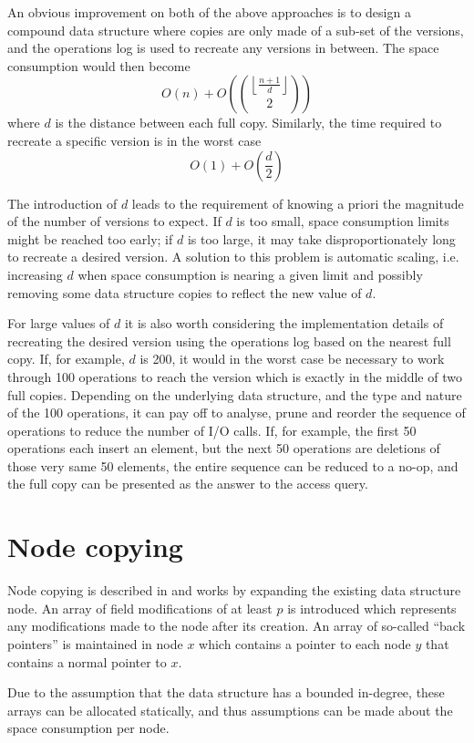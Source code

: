 An obvious improvement on both of the above approaches is to design a compound
data structure where copies are only made of a sub-set of the versions, and the
operations log is used to recreate any versions in between. The space
consumption would then become
$$O(n)+O\left(\binom{\left\lfloor{\frac{n+1}{d}}\right\rfloor}{2}\right)$$ where
$d$ is the distance between each full copy. Similarly, the time required to
recreate a specific version is in the worst case
$$O(1)+O\left(\frac{d}{2}\right)$$

The introduction of $d$ leads to the requirement of knowing a priori the
magnitude of the number of versions to expect. If $d$ is too small, space
consumption limits might be reached too early; if $d$ is too large, it may take
disproportionately long to recreate a desired version. A solution to this
problem is automatic scaling, i.e. increasing $d$ when space consumption is
nearing a given limit and possibly removing some data structure copies to
reflect the new value of $d$.

For large values of $d$ it is also worth considering the implementation details
of recreating the desired version using the operations log based on the
nearest full copy. If, for example, $d$ is 200, it would in the worst case be
necessary to work through 100 operations to reach the version which is exactly
in the middle of two full copies. Depending on the underlying data structure,
and the type and nature of the 100 operations, it can pay off to analyse,
prune and reorder the sequence of operations to reduce the number of I/O calls.
If, for example, the first 50 operations each insert an element, but the next 50
operations are deletions of those very same 50 elements, the entire sequence can
be reduced to a no-op, and the full copy can be presented as the answer to the
access query.

\section{Node copying}
Node copying is described in \cite{Driscoll198986} and works by expanding the
existing data structure node. An array of field modifications of at least $p$ is
introduced which represents any modifications made to the node after its
creation. An array of so-called ``back pointers'' is maintained in node $x$
which contains a pointer to each node $y$ that contains a normal pointer to $x$.

Due to the assumption that the data structure has a bounded in-degree, these
arrays can be allocated statically, and thus assumptions can be made about the
space consumption per node.

